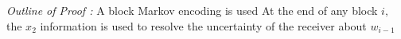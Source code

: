 \documentclass[preview]{standalone}
\begin{document}
\begin{center}
\textit{Outline of Proof :} A block Markov encoding is used At the end of any block $i,$ the $x_2$ information is used to resolve the uncertainty of the receiver about $w_{i-1}$
\end{center}
\end{document}
